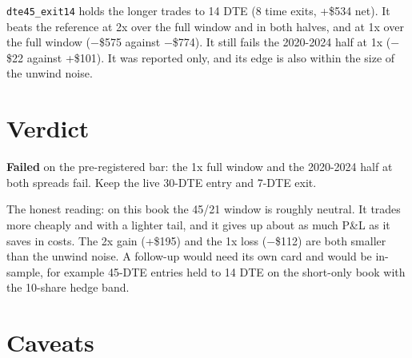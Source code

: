 \documentclass{article}
\begin{document}
\texttt{dte45\_\allowbreak{}exit14} holds the longer trades to 14 DTE (8 time exits, +\$534 net). It beats the reference at 2x over the full window and in both halves, and at 1x over the full window (\ensuremath{-}\$575 against \ensuremath{-}\$774). It still fails the 2020-2024 half at 1x (\ensuremath{-}\$22 against +\$101). It was reported only, and its edge is also within the size of the unwind noise.

\section{Verdict}

\textbf{Failed} on the pre-registered bar: the 1x full window and the 2020-2024 half at both spreads fail. Keep the live 30-DTE entry and 7-DTE exit.

The honest reading: on this book the 45/\allowbreak{}21 window is roughly neutral. It trades more cheaply and with a lighter tail, and it gives up about as much P\&L as it saves in costs. The 2x gain (+\$195) and the 1x loss (\ensuremath{-}\$112) are both smaller than the unwind noise. A follow-up would need its own card and would be in-sample, for example 45-DTE entries held to 14 DTE on the short-only book with the 10-share hedge band.

\section{Caveats}
\end{document}
